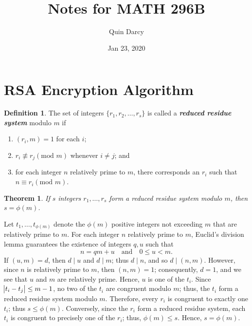 \documentclass{article}
\makeatletter
\newtheorem{theorem}{Theorem}[section]
\theoremstyle{definition}
\newtheorem{definition}{Definition}[section]
\theoremstyle{remark}
\let\oldproofname=\proofname
\renewcommand{\proofname}{\textit{\oldproofname}}
\theoremstyle{definition}
\renewenvironment{proof}[1][\proofname]{\par
  \pushQED{\qed}%
  \normalfont \topsep6\p@\@plus6\p@\relax
  \list{}{\leftmargin=0mm
          \rightmargin=0mm
          \settowidth{\itemindent}{\itshape#1}%
          \labelwidth=\itemindent
          \parsep=0pt \listparindent=0mm%
  }
  \item[\hskip\labelsep
        \itshape
    #1\@addpunct{.}]\ignorespaces
}{%
  \popQED\endlist\@endpefalse
}
\makeatother
\begin{document}
\title{Notes for MATH 296B}
\author{Quin Darcy}
\date{Jan 23, 2020}
\maketitle

\section{RSA Encryption Algorithm}

    \begin{definition}\label{def:1.1}
        The set of integers $\{r_1,r_2,\dots,r_s\}$ is called a \textbf{\textit{reduced residue system}} modulo $m$ if
            \begin{enumerate}[label=(\roman*)]
                \item $(r_i,m)=1$ for each $i$;
                \item $r_i\not\equiv r_j(\text{mod }m)$ whenever $i\not= j$; and
                \item for each integer $n$ relatively prime to $m$, there corresponds an $r_i$ such that $n\equiv r_i(\text{mod }m)$.
            \end{enumerate}
    \end{definition}
    \begin{theorem}\label{thm:1.1}
        If $s$ integers $r_1, \dots, r_s$ form a reduced residue system modulo $m$, then $s=\phi(m)$.
    \end{theorem}
        \begin{proof}
            Let $t_1,\dots, t_{\phi(m)}$ denote the $\phi(m)$ positive integers not exceeding $m$ that are relatively prime to $m$. For each integer $n$ relatively prime to $m$, Euclid's division lemma guarantees the existence of integers $q,u$ such that 
                \begin{equation*}
                    n=qm+u\quad\text{and}\quad 0\leq u<m.
                \end{equation*}
            If $(u,m)=d$, then $d\mid u$ and $d\mid m$; thus $d\mid n$, and so $d\mid(n,m)$. However, since $n$ is relatively prime to $m$, then $(n,m)=1$; consequently, $d=1$, and we see that $u$ and $m$ are relatively prime. Hence, $u$ is one of the $t_i$. Since $\abs{t_i-t_j}\leq m-1$, no two of the $t_i$ are congruent modulo $m$; thus, the $t_i$ form a reduced residue system modulo $m$. Therefore, every $r_i$ is congruent to exactly one $t_i$; thus $s\leq\phi(m)$. Conversely, since the $r_i$ form a reduced residue system, each $t_i$ is congruent to precisely one of the $r_i$; thus, $\phi(m)\leq s$. Hence, $s=\phi(m)$.
        \end{proof}\newpage
\end{document}
